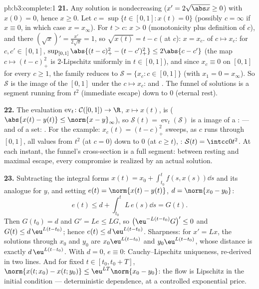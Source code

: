 \begin{solution}{pb:b3:complete:1}
\textbf{21.} Any solution is nondecreasing ($x' = 2\sqrt{\abs
x} \geq 0$) with $x(0) = 0$, hence $x \geq 0$. Let $c =
\sup\{t \in [0,1] : x(t) = 0\}$ (possibly $c = \infty$ if
$x \equiv 0$, in which case $x = x_\infty$). For $t > c$: $x
> 0$ (monotonicity plus definition of $c$), and there $(\sqrt
x)' = \frac{x'}{2\sqrt x} = 1$, so $\sqrt{x(t)} = t - c$
( at $c$): $x = x_c$.  of $c \mapsto
x_c$: for $c, c' \in [0, 1]$, $\sup_{[0,1]}\abs{(t - c)_+^2 -
(t - c')_+^2} \leq 2\abs{c - c'}$ (the map $c \mapsto
(t-c)_+^2$ is $2$-Lipschitz uniformly in $t \in [0,1]$), and
since $x_c \equiv 0$ on $[0,1]$ for every $c \geq 1$, the
family reduces to $\mathcal S = \{x_c : c \in [0,1]\}$ (with
$x_1 = 0 = x_\infty$). So $\mathcal S$ is the image of the
  $[0,1]$ under the  $c
\mapsto x_c$:  and . The funnel of solutions
is a  segment running from $t^2$ (immediate
escape) down to $0$ (eternal rest).

\textbf{22.} The evaluation $\operatorname{ev}_t\colon
\mathcal C([0,1]) \to \R$, $x \mapsto x(t)$, is 
($\abs{x(t) - y(t)} \leq \norm{x - y}_\infty$), so $\mathcal
S(t) = \operatorname{ev}_t(\mathcal S)$ is a  image
of a :  --- and of a  set: .
For the example: $x_c(t) = (t - c)_+^2$ sweeps, as $c$ runs
through $[0, 1]$, all values from $t^2$ (at $c = 0$) down to
$0$ (at $c \geq t$), : $\mathcal S(t) =
\intcc0{t^2}$. At each instant, the funnel's cross-section is
a full segment: between resting and maximal escape, every
compromise is realized by an actual solution.

\textbf{23.} Subtracting the integral forms $x(t) = x_0 +
\int_{t_0}^tf(s, x(s))\dd s$ and its analogue for $y$, and
setting $e(t) = \norm{x(t) - y(t)}$, $d = \norm{x_0 - y_0}$:
\[
e(t) \leq d + \int_{t_0}^tL\,e(s)\dd s = G(t).
\]
Then $G(t_0) = d$ and $G' = Le \leq LG$, so $\bigl(\eu^{-L(t
- t_0)}G\bigr)' \leq 0$ and $G(t) \leq d\,\eu^{L(t - t_0)}$;
hence $e(t) \leq d\,\eu^{L(t-t_0)}$. Sharpness: for $x' =
Lx$, the solutions through $x_0$ and $y_0$ are $x_0\eu^{L(t -
t_0)}$ and $y_0\eu^{L(t-t_0)}$, whose distance is exactly
$d\,\eu^{L(t-t_0)}$. With $d = 0$, $e \equiv 0$:
Cauchy--Lipschitz uniqueness, re-derived in two lines. And
for fixed $t \in [t_0, t_0 + T]$, $\norm{x(t; x_0) - x(t;
y_0)} \leq \eu^{LT}\norm{x_0 - y_0}$: the flow is Lipschitz
in the initial condition --- deterministic dependence, at a
controlled exponential price.


\end{solution}
